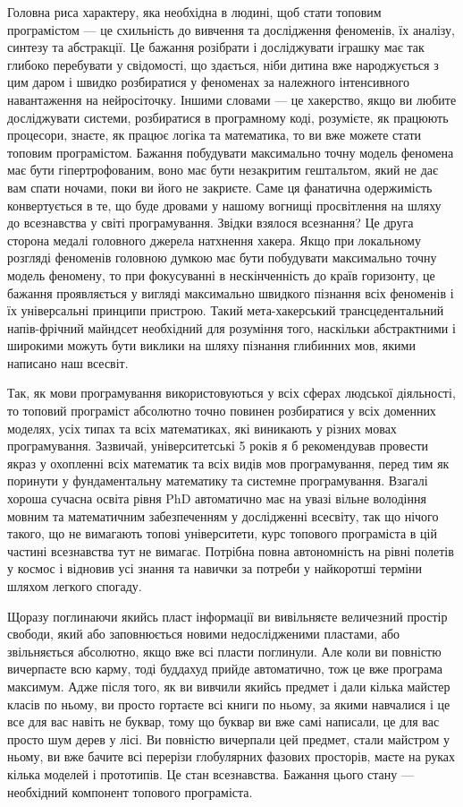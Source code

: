 Головна риса характеру, яка необхідна в людині, щоб стати
топовим програмістом --- це схильність до вивчення та дослідження феноменів,
їх аналізу, синтезу та абстракції. Це бажання розібрати і
досліджувати іграшку має так глибоко перебувати у свідомості,
що здається, ніби дитина вже народжується з цим даром і
швидко розбиратися у феноменах за належного інтенсивного
навантаження на нейросіточку. Іншими словами --- це хакерство,
якщо ви любите досліджувати системи, розбиратися в програмному
коді, розумієте, як працюють процесори, знаєте, як працює
логіка та математика, то ви вже можете стати топовим програмістом.
Бажання побудувати максимально точну модель феномена має
бути гіпертрофованим, воно має бути незакритим гештальтом,
який не дає вам спати ночами, поки ви його не закриєте.
Саме ця фанатична одержимість конвертується в те, що буде
дровами у нашому вогнищі просвітлення на шляху до всезнавства
у світі програмування. Звідки взялося всезнання?
Це друга сторона медалі головного джерела натхнення хакера.
Якщо при локальному розгляді феноменів головною думкою має
бути побудувати максимально точну модель феномену, то при
фокусуванні в нескінченність до країв горизонту, це бажання
проявляється у вигляді максимально швидкого пізнання всіх
феноменів і їх універсальні принципи пристрою. Такий
мета-хакерський трансцедентальний напів-фрічний майндсет
необхідний для розуміння того, наскільки абстрактними і
широкими можуть бути виклики на шляху пізнання глибинних
мов, якими написано наш всесвіт.

Так, як мови програмування використовуються у всіх сферах
людської діяльності, то топовий програміст абсолютно точно
повинен розбиратися у всіх доменних моделях, усіх типах та
всіх математиках, які виникають у різних мовах програмування.
Зазвичай, університетські 5 років я б рекомендував провести
якраз у охопленні всіх математик та всіх видів мов програмування,
перед тим як поринути у фундаментальну математику та системне
програмування. Взагалі хороша сучасна освіта рівня PhD автоматично
має на увазі вільне володіння мовним та математичним
забезпеченням у дослідженні всесвіту, так що нічого
такого, що не вимагають топові університети, курс
топового програміста в цій частині всезнавства тут не вимагає.
Потрібна повна автономність на рівні полетів у космос і
відновив усі знання та навички за потреби у найкоротші
терміни шляхом легкого спогаду.

Щоразу поглинаючи якийсь пласт інформації ви вивільняєте
величезний простір свободи, який або заповнюється новими
недослідженими пластами, або звільняється абсолютно, якщо
вже всі пласти поглинули. Але коли ви повністю вичерпаєте
всю карму, тоді буддахуд прийде автоматично, тож це вже
програма максимум. Адже після того, як ви вивчили якийсь
предмет і дали кілька майстер класів по ньому, ви просто
гортаєте всі книги по ньому, за якими навчалися і це все
для вас навіть не буквар, тому що буквар ви вже самі написали,
це для вас просто шум дерев у лісі. Ви повністю вичерпали цей
предмет, стали майстром у ньому, ви вже бачите всі перерізи
глобулярних фазових просторів, маєте на руках кілька моделей
і прототипів. Це стан всезнавства. Бажання цього стану ---
необхідний компонент топового програміста.

